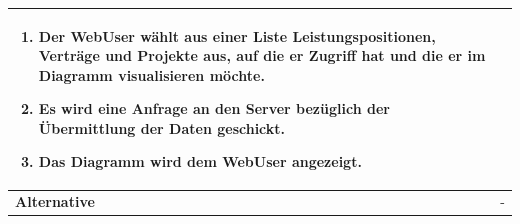 \begin{longtable}[c]{|p{4cm}|p{10cm}|}
\begin{enumerate}
        \item Der WebUser wählt aus einer Liste Leistungspositionen, Verträge und Projekte aus, auf die er Zugriff hat und die er im Diagramm visualisieren möchte.
        \item Es wird eine Anfrage an den Server bezüglich der Übermittlung der Daten geschickt.
        \item Das Diagramm wird dem WebUser angezeigt.
    \end{enumerate}                                                                                                                                                                                                             \\ \hline

    \textbf{Alternative}                & -                                                                                                                                                                                                \\ \hline


\end{longtable}
